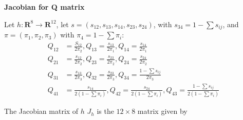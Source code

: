 \documentclass[12pt,letterpaper]{article}
\begin{document}
\begin{center}
\textbf{Jacobian for Q matrix}
\end{center}

Let $h:\mathbf{R}^8 \rightarrow \mathbf{R}^{12}$, let
$s=(s_{12},s_{13},s_{14},s_{23},s_{24})$, with $s_{34}=1-\sum s_{ij}$,
and $\pi=(\pi_1,\pi_2,\pi_3)$ with $\pi_4=1-\sum \pi_i$:
\begin{align*}
Q_{12}&=\frac{S_{12}}{2\pi_2}, Q_{13}=\frac{s_{13}}{2\pi_1},
Q_{14}=\frac{s_{14}}{2\pi_1}\\
Q_{21}&=\frac{s_{12}}{2\pi_2}, Q_{23}=\frac{s_{23}}{2\pi_2},
Q_{24}=\frac{s_{24}}{2\pi_2}\\
Q_{31}&=\frac{s_{13}}{2\pi_3}, Q_{32}=\frac{s_{23}}{2\pi_3},
Q_{34}=\frac{1-\sum s_{ij}}{2\pi_3}\\
Q_{41}&=\frac{s_{14}}{2(1-\sum \pi_i)}, Q_{42}=\frac{s_{24}}{2(1-\sum
  \pi_i)}, Q_{43}=\frac{1-\sum s_{ij}}{2(1-\sum \pi_i)}
\end{align*}

The Jacobian matrix of $h$ $J_h$ is the $12 \times 8$ matrix given by
\end{document}
